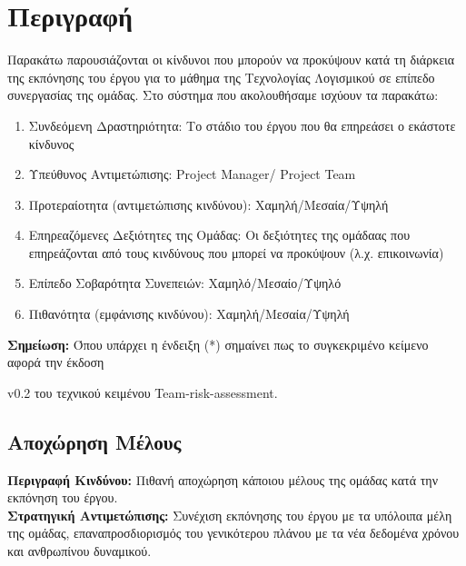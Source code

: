 \documentclass{article}
\begin{document}
{
  \hypersetup{linkcolor=black}
  \tableofcontents
}

\section{Περιγραφή}

Παρακάτω παρουσιάζονται οι κίνδυνοι που μπορούν να προκύψουν κατά τη διάρκεια της εκπόνησης του έργου για το μάθημα της Τεχνολογίας Λογισμικού σε επίπεδο συνεργασίας της ομάδας. Στο σύστημα που ακολουθήσαμε ισχύουν τα παρακάτω:
\begin{enumerate}
    \item Συνδεόμενη Δραστηριότητα: Το στάδιο του έργου που θα επηρεάσει ο εκάστοτε κίνδυνος
    \item Υπεύθυνος Αντιμετώπισης: Project Manager/ Project Team
    \item Προτεραίοτητα (αντιμετώπισης κινδύνου): Χαμηλή/Μεσαία/Υψηλή
    \item Επηρεαζόμενες Δεξιότητες της Ομάδας: Οι δεξιότητες της ομάδαας που επηρεάζονται από τους κινδύνους που μπορεί  να προκύψουν (λ.χ. επικοινωνία) 
    \item Επίπεδο Σοβαρότητα Συνεπειών: Χαμηλό/Μεσαίο/Υψηλό
    \item Πιθανότητα (εμφάνισης κινδύνου): Χαμηλή/Μεσαία/Υψηλή
\end{enumerate}

\vspace{0.1cm}

\textbf{Σημείωση:} Όπου υπάρχει η ένδειξη (*) σημαίνει πως το συγκεκριμένο κείμενο αφορά την έκδοση \par v0.2 του τεχνικού κειμένου Team-risk-assessment.

\subsection{Αποχώρηση Μέλους}

\textbf{Περιγραφή Κινδύνου:} Πιθανή αποχώρηση κάποιου μέλους της ομάδας κατά την εκπόνηση του έργου. \\

\textbf{Στρατηγική Αντιμετώπισης:}  Συνέχιση εκπόνησης του έργου με τα  υπόλοιπα μέλη της ομάδας, επαναπροσδιορισμός του γενικότερου πλάνου με τα νέα δεδομένα χρόνου και ανθρωπίνου δυναμικού.

\vspace{0.2cm}
 
\end{document}
